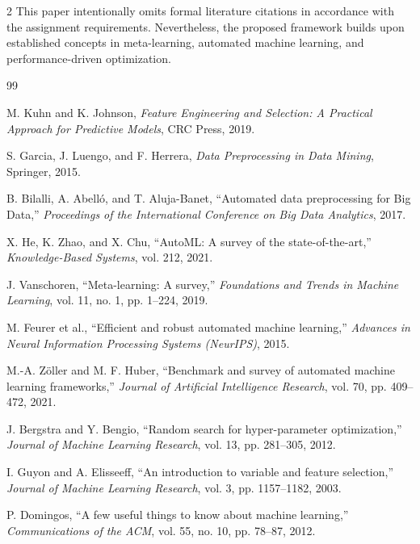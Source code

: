 \documentclass[11pt,a4paper]{article}
\begin{document}
\begin{multicols}{2}
This paper intentionally omits formal literature citations in accordance with the assignment requirements. Nevertheless, the proposed framework builds upon established concepts in meta-learning, automated machine learning, and performance-driven optimization.


\begin{thebibliography}{99}

M. Kuhn and K. Johnson,
\textit{Feature Engineering and Selection: A Practical Approach for Predictive Models},
CRC Press, 2019.

S. Garcia, J. Luengo, and F. Herrera,
\textit{Data Preprocessing in Data Mining},
Springer, 2015.

B. Bilalli, A. Abelló, and T. Aluja-Banet,
``Automated data preprocessing for Big Data,''
\textit{Proceedings of the International Conference on Big Data Analytics}, 2017.

X. He, K. Zhao, and X. Chu,
``AutoML: A survey of the state-of-the-art,''
\textit{Knowledge-Based Systems}, vol. 212, 2021.

J. Vanschoren,
``Meta-learning: A survey,''
\textit{Foundations and Trends in Machine Learning},
vol. 11, no. 1, pp. 1--224, 2019.

M. Feurer et al.,
``Efficient and robust automated machine learning,''
\textit{Advances in Neural Information Processing Systems (NeurIPS)}, 2015.

M.-A. Zöller and M. F. Huber,
``Benchmark and survey of automated machine learning frameworks,''
\textit{Journal of Artificial Intelligence Research}, vol. 70, pp. 409--472, 2021.

J. Bergstra and Y. Bengio,
``Random search for hyper-parameter optimization,''
\textit{Journal of Machine Learning Research}, vol. 13, pp. 281--305, 2012.

I. Guyon and A. Elisseeff,
``An introduction to variable and feature selection,''
\textit{Journal of Machine Learning Research}, vol. 3, pp. 1157--1182, 2003.

P. Domingos,
``A few useful things to know about machine learning,''
\textit{Communications of the ACM}, vol. 55, no. 10, pp. 78--87, 2012.

\end{thebibliography}


\end{multicols}
\end{document}
